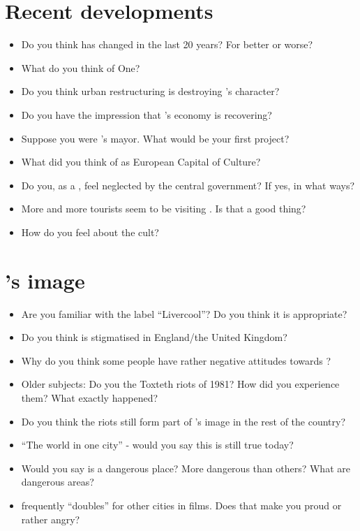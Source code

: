 	\section*{Recent developments}
	\begin{multicols}{2}
		\begin{itemize}
			\item Do you think  has changed in the last 20 years? For better or worse?
			\item What do you think of  One?
			\item Do you think urban restructuring is destroying 's character?
			\item Do you have the impression that 's economy is recovering?
			\item Suppose you were 's mayor. What would be your first project?
			\item What did you think of  as European Capital of Culture?
			\item Do you, as a , feel neglected by the central government? If yes, in what ways?
			\item More and more tourists seem to be visiting . Is that a good thing?
			\item How do you feel about the  cult?
		\end{itemize}
	\end{multicols}
	
	\section*{'s image}
	\begin{multicols}{2}
		\begin{itemize}
			\item Are you familiar with the label “Livercool”? Do you think it is appropriate?
			\item Do you think  is stigmatised in England/the United Kingdom?
			\item Why do you think some people have rather negative attitudes towards ?
			\item Older subjects: Do you  the Toxteth riots of 1981? How did you experience them? What exactly happened?
			\item Do you think the riots still form part of 's image in the rest of the country?
			\item ``The world in one city'' - would you say this is still true today?
			\item Would you say  is a dangerous place? More dangerous than others? What are dangerous areas?
			\item {} frequently ``doubles'' for other cities in films. Does that make you proud or rather angry?
		\end{itemize}
	\end{multicols}
	

